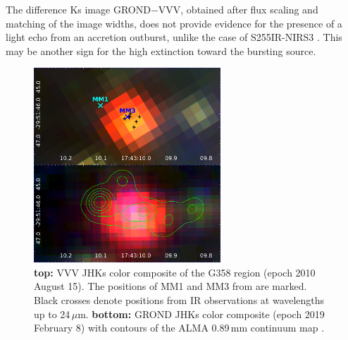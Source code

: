\documentclass[longauth,usenatbib]{aa}
\begin{document}
The difference Ks image GROND$-$VVV, obtained after flux scaling and matching of the image widths, does not provide evidence for the presence of a light echo from an accretion outburst, unlike the case of S255IR-NIRS3 . This may be another sign for the high extinction toward the bursting source.

\begin{figure}   %
\centering
	\includegraphics[width=7cm]{vg_3.png}
	\caption{\textbf{top:} VVV JHKs color composite of the G358 region (epoch 2010 August 15). The positions of MM1 and MM3 from  are marked. Black crosses denote positions from IR observations at wavelengths up to 24\,$\mu$m. \textbf{bottom:} GROND JHKs color composite (epoch 2019 February 8) with contours of the ALMA 0.89\,mm continuum map .
	}
 \label{fig:GROND}
\end{figure}
\end{document}
